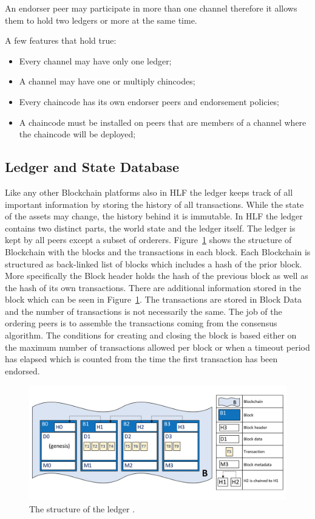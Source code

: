 An endorser peer may participate in more than one channel therefore it allows them to hold two ledgers or more at the same time. 

A few features that hold true: 
\begin{itemize}
  \item Every channel may have only one ledger;
  \item A channel may have one or multiply chincodes;
  \item Every chaincode has its own endorser peers and endorsement policies;
  \item A chaincode must be installed on peers that are members of a channel where the chaincode will be deployed; 
  \end{itemize}


\subsection{Ledger and State Database}

Like any other Blockchain platforms also in HLF the ledger keeps track of all important information by storing the history of all transactions. While the state of the assets may change, the history behind it is immutable. In HLF the ledger contains two distinct parts, the world state and the ledger itself. 
The ledger is kept by all peers except a subset of orderers. 
Figure~\ref{fig:ledgerdiagram} shows the structure of Blockchain with the blocks and the transactions in each block. Each Blockchain is structured as back-linked list of blocks which includes a hash of the prior block. More specifically the Block header holds the hash of the previous block as well as the hash of its own transactions. There are additional information stored in the block which can be seen in  Figure~\ref{fig:ledgerdiagram}. The transactions are stored in Block Data and the number of transactions is not necessarily the same. The job of the ordering peers is to assemble the transactions coming from the consensus algorithm. The conditions for creating and closing the block is based either on the maximum number of transactions allowed per block or when a timeout period has elapsed which is counted from the time the first transaction has been endorsed. 

\begin{figure}[!htb]
    \centering
    \includegraphics[width=1\textwidth]{figures/ledgediagram.png}
    \caption{The structure of the ledger \cite{ledger}. }
    \label{fig:ledgerdiagram}
\end{figure}

